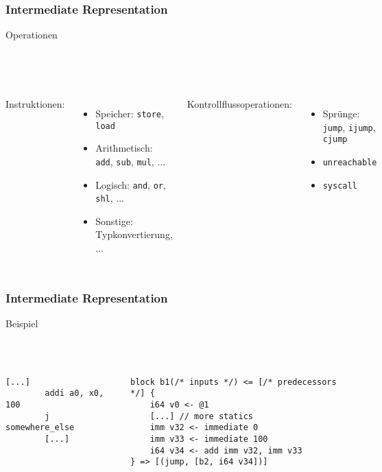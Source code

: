 \begin{frame}
    \frametitle{Intermediate Representation}{Operationen}
    \pause{}

    ~\\
    ~\\

    \begin{columns}[c]
        Instruktionen:
        \begin{itemize}
            \item Speicher: \texttt{store}, \texttt{load}
            \item Arithmetisch: \texttt{add}, \texttt{sub}, \texttt{mul}, ...
            \item Logisch: \texttt{and}, \texttt{or}, \texttt{shl}, ...
            \item Sonstige: Typkonvertierung, ...
        \end{itemize}

        \pause{}
        Kontrollflussoperationen:
        \begin{itemize}
            \item Sprünge: \texttt{jump}, \texttt{ijump}, \texttt{cjump}
            \item \texttt{unreachable}
            \item \texttt{syscall}
        \end{itemize}
    \end{columns}
\end{frame}


\begin{frame}[fragile]
    \frametitle{Intermediate Representation}{Beispiel}
    \pause{}
    ~\\
    ~\\
    ~\\
    \begin{columns}[c]
        \begin{lstlisting}[language=rv64]
        [...]
        addi a0, x0, 100
        j somewhere_else
        [...]
        \end{lstlisting}

        \pause{}

        \pause{}

        \begin{lstlisting}[language=SbtIr]
block b1(/* inputs */) <= [/* predecessors */] {
    i64 v0 <- @1
    [...] // more statics
    imm v32 <- immediate 0
    imm v33 <- immediate 100
    i64 v34 <- add imm v32, imm v33
} => [(jump, [b2, i64 v34])]
    \end{lstlisting}
    \end{columns}

\end{frame}
\clearpage

